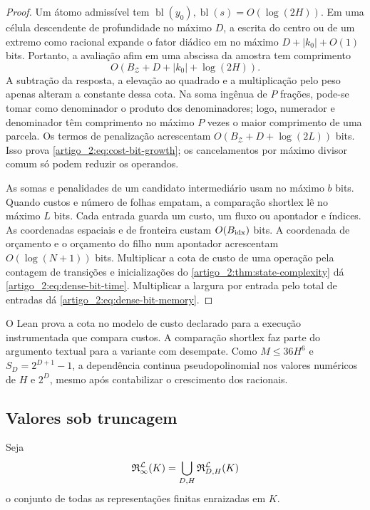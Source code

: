 \begin{proof}
Um átomo admissível tem $\operatorname{bl}(y_0),
\operatorname{bl}(s)=O(\log(2H))$. Em uma célula descendente de profundidade
no máximo $D$, a escrita do centro ou de um extremo como racional expande o fator
diádico em no máximo $D+|k_0|+O(1)$ bits. Portanto, a avaliação afim em uma
abscissa da amostra tem comprimento
\[
 O(B_{\mathcal Z}+D+|k_0|+\log(2H)).
\]
A subtração da resposta, a elevação ao quadrado e a multiplicação pelo peso apenas alteram
a constante dessa cota. Na soma ingênua de $P$ frações, pode-se tomar como
denominador o produto dos denominadores; logo, numerador e denominador têm
comprimento no máximo $P$ vezes o maior comprimento de uma parcela. Os termos
de penalização acrescentam $O(B_{\mathcal Z}+D+\log(2L))$ bits. Isso prova
\eqref{artigo_2:eq:cost-bit-growth}; os cancelamentos por máximo divisor comum só podem
reduzir os operandos.

As somas e penalidades de um candidato intermediário usam no máximo
$b$ bits. Quando custos e número de folhas empatam, a comparação shortlex
lê no máximo $L$ bits. Cada entrada guarda um custo, um fluxo ou apontador
e índices. As coordenadas espaciais e de fronteira custam
$O(B_{\rm idx})$ bits. A coordenada de orçamento e o orçamento do filho
num apontador acrescentam $O(\log(N+1))$ bits. Multiplicar a cota de custo de
uma operação pela contagem de transições e inicializações do
\cref{artigo_2:thm:state-complexity} dá \eqref{artigo_2:eq:dense-bit-time}.
Multiplicar a largura por entrada pelo total de entradas dá
\eqref{artigo_2:eq:dense-bit-memory}.
\end{proof}

O Lean prova a cota no modelo de custo declarado para a execução instrumentada
que compara custos. A comparação shortlex faz parte do argumento textual
para a variante com desempate. Como $M\le36H^6$ e $S_D=2^{D+1}-1$,
a dependência continua pseudopolinomial nos valores numéricos de $H$ e $2^D$,
mesmo após contabilizar o crescimento dos racionais.

\subsection{Valores sob truncagem}

Seja
\[
 \mathfrak{R}_{\infty}^{\mathcal{L}}(K)
 =\bigcup_{D,H}\mathfrak{R}_{D,H}^{\mathcal{L}}(K)
\]
o conjunto de todas as representações finitas enraizadas em $K$.

